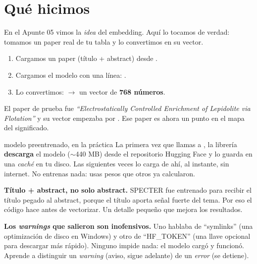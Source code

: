 \documentclass[11pt,a4paper]{article}
\begin{document}

\section{Qué hicimos}

En el Apunte 05 vimos la \emph{idea} del embedding. Aquí lo tocamos de verdad: tomamos un
paper real de tu tabla y lo convertimos en su vector.

\begin{enumerate}
  \item Cargamos un paper (título + abstract) desde .
  \item Cargamos el modelo con una línea: .
  \item Lo convertimos:  $\rightarrow$ un vector de \textbf{768 números}.
\end{enumerate}

El paper de prueba fue \emph{``Electrostatically Controlled Enrichment of Lepidolite via
Flotation''} y su vector empezaba por \codigo{[-0.59, -0.16, 1.34, ...]}. Ese paper es ahora
un punto en el mapa del significado.

\begin{concepto}{modelo preentrenado, en la práctica}
La primera vez que llamas a , la librería
\textbf{descarga} el modelo ($\sim$440 MB) desde el repositorio Hugging Face y lo guarda en
una \emph{caché} en tu disco. Las siguientes veces lo carga de ahí, al instante, sin internet.
No entrenas nada: usas pesos que otros ya calcularon.
\end{concepto}

\begin{ojo}
\textbf{Título + abstract, no solo abstract.} SPECTER fue entrenado para recibir el título
pegado al abstract, porque el título aporta señal fuerte del tema. Por eso el código hace
 antes de vectorizar. Un detalle pequeño que mejora
los resultados.
\end{ojo}

\begin{ojo}
\textbf{Los \emph{warnings} que salieron son inofensivos.} Uno hablaba de ``symlinks'' (una
optimización de disco en Windows) y otro de ``HF\_TOKEN'' (una llave opcional para descargar
más rápido). Ninguno impide nada: el modelo cargó y funcionó. Aprende a distinguir un
\emph{warning} (aviso, sigue adelante) de un \emph{error} (se detiene).
\end{ojo}
\end{document}
